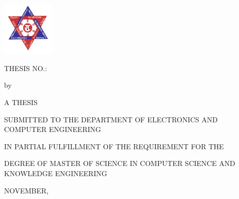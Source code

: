 \begin{titlepage}

\begin{center}
\includegraphics[height = 2.6cm]{frontmatter/images/tu.jpg} 

\linespread{1.5}

\bf{
    \vspace{0.5cm}

\MakeUppercase{\myuniversity}

\MakeUppercase{\myinstitute}

\MakeUppercase{\mycampus }

\vspace{1cm}

\begin{flushleft}
   \MakeUppercase{thesis no.: \roll } 

   
\end{flushleft}

{\thetitle}





\vspace{1cm}
{by}
 
\theauthor

\vspace{1cm}


\vspace{1cm}

{A THESIS  

SUBMITTED TO THE DEPARTMENT OF ELECTRONICS AND
COMPUTER ENGINEERING 

IN PARTIAL FULFILLMENT OF THE REQUIREMENT FOR THE 

DEGREE OF MASTER OF SCIENCE IN COMPUTER SCIENCE AND KNOWLEDGE ENGINEERING
}
\vspace{1cm}

\MakeUppercase{\mydepartment}

\MakeUppercase{\campusaddress}

\vspace{1cm}

NOVEMBER,
\thedate
}
\end{center}
\end{titlepage}
